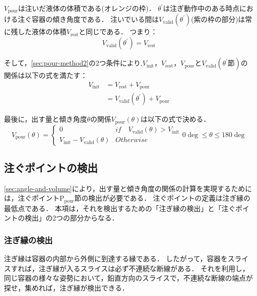 	$V_\mathrm{pour}$は注いだ液体の体積である(オレンジの枠)．
	$\theta^{\prime}$は注ぎ動作中のある時点における注ぐ容器の傾き角度である．
	注いでいる間は$V_\mathrm{valid}(\theta^{\prime})$(紫の枠の部分)は常に残した液体の体積$V_\mathrm{rest}$と同じである．
	つまり：
	$$V_\mathrm{valid}(\theta^{\prime})=V_\mathrm{rest}$$

	そして，\ref{sec:pour-method2}の2つ条件により,$V_\mathrm{init}$，$V_\mathrm{rest}$，$V_\mathrm{pour}$と$V_\mathrm{valid}(\theta^{\prime}節)$の関係は以下の式を満たす：
	\begin{equation}
	\begin{split}
	V_\mathrm{init}&=V_\mathrm{rest} + V_\mathrm{pour}\\
	&=V_\mathrm{valid}(\theta^{\prime}) + V_\mathrm{pour}
	\end{split}
	\end{equation}
	
	最後に，出す量と傾き角度$\theta$の関係$V_\mathrm{pour}(\theta)$は以下の式で決める．
	\begin{equation}
	V_\mathrm{pour}(\theta) = \left\{
	\begin{array}{lc}
	0 & if \quad V_\mathrm{valid}(\theta) > V_\mathrm{init}\\
	V_\mathrm{init} - V_\mathrm{valid}(\theta) & Otherwise
	\end{array}
	\right. 
	0\deg \leq \theta \leq 180\deg
	\end{equation}


	\subsection{注ぐポイントの検出}\label{sec:pour-point-detect}
	\ref{sec:angle-and-volume}により，出す量と傾き角度の関係の計算を実現するためには，注ぐポイント$\mathrm{P}_\mathrm{pour}節$の検出が必要である．
	注ぐポイントの定義は注ぎ縁の最低点である．
	本項は，それを検出するための「注ぎ縁の検出」と「注ぐポイントの検出」の2つの部分からなる．
	
		\subsubsection{注ぎ縁の検出}\label{sec:pour-edge-detect}
		注ぎ縁は容器の内部から外側に到達する縁である．
		したがって，容器をスライスすれば，注ぎ縁が入るスライスは必ず不連続な断線がある．
		それを利用し，同じ容器の様々な姿勢において，鉛直方向のスライスで，不連続な断線の端点が探せ，集めれば，注ぎ縁が検出できる．	
		
